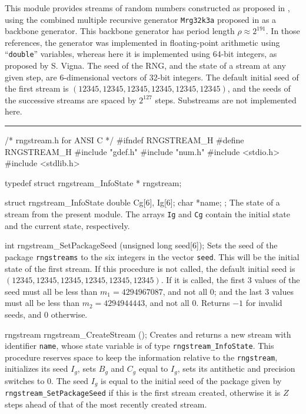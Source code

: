 
This module provides streams of random numbers constructed as proposed in \cite{rLEC02a},
using the combined multiple recursive generator {\tt Mrg32k3a} proposed in \cite{rLEC99b}
as a backbone generator.  This backbone generator has period length $\rho\approx 2^{191}$.
In those references, the generator was implemented in floating-point arithmetic
using ``\texttt{double}'' variables, whereas here it is implemented using 64-bit integers,
as proposed by S. Vigna.
The seed of the RNG, and the state of a stream at any given step,
are 6-dimensional vectors of 32-bit integers.
The default initial seed of the first stream is 
$(12345, 12345, 12345, 12345, 12345, 12345)$,
and the seeds of the successive streams are spaced by $2^{127}$ steps.
Substreams are not implemented here.


\bigskip\hrule

\code\hide
/* rngstream.h for ANSI C */
#ifndef RNGSTREAM_H
#define RNGSTREAM_H
\endhide
#include "gdef.h"
#include "num.h"
#include <stdio.h>
#include <stdlib.h>

typedef struct rngstream_InfoState * rngstream;

struct rngstream_InfoState {
   double Cg[6], Ig[6];
   char *name;
};
\endcode
 \tab
   The state of a stream from the present module.
   The arrays {\tt Ig} and {\tt Cg} contain the initial state
   and the current state, respectively.
 \endtab
\code

int rngstream_SetPackageSeed (unsigned long seed[6]);
\endcode
  \tab  Sets the seed of the package {\tt rngstreams} to the 
   six integers in the vector {\tt seed}.
   This will be the initial state of the first stream.
   If this procedure is not called, the default initial seed
   is $(12345, 12345, 12345, 12345, 12345, 12345)$.
   If it is called, the first 3 values of the seed must all be
   less than $m_1 = 4294967087$, and not all 0;
   and the last 3 values 
   must all be less than $m_2 = 4294944443$, and not all 0.
   Returns $-1$ for invalid seeds, and 0 otherwise.
 \endtab
\code

rngstream rngstream_CreateStream ();
\endcode
 \tab Creates and returns a new stream with identifier {\tt name},
   whose state variable is of type {\tt rngstream\_InfoState}.
   This procedure reserves space to keep the information relative to
   the {\tt rngstream}, initializes its seed $I_g$,
   sets $B_g$ and $C_g$ equal to $I_g$, sets its antithetic and precision
   switches to 0.
   The seed $I_g$ is equal to the initial seed of the package given by 
   {\tt rngstream\_SetPackageSeed} if this is the first stream created,
   otherwise it is $Z$ steps ahead of that of the most recently
   created stream.
 \endtab
\code

